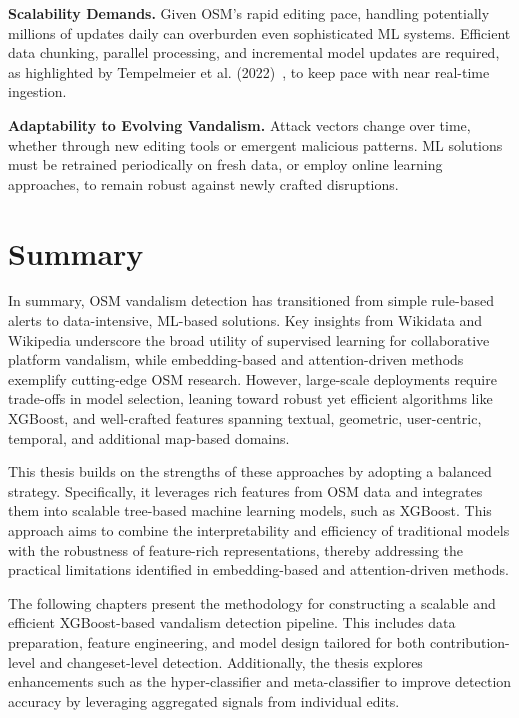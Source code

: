 \documentclass[
    13pt, %
    a4paper, %
    listof=totoc, %
    bibliography=totoc, %
    index=totoc, %
    headsepline
]{scrreprt}
\begin{document}
\noindent
\textbf{Scalability Demands.}
Given OSM’s rapid editing pace, handling potentially millions of updates daily can overburden even sophisticated ML systems. Efficient data chunking, parallel processing, and incremental model updates are required, as highlighted by Tempelmeier et al. (2022)~\cite{Tempelmeier2022}, to keep pace with near real-time ingestion.

\noindent
\textbf{Adaptability to Evolving Vandalism.}
Attack vectors change over time, whether through new editing tools or emergent malicious patterns. ML solutions must be retrained periodically on fresh data, or employ online learning approaches, to remain robust against newly crafted disruptions.


\section{Summary}

In summary, OSM vandalism detection has transitioned from simple rule-based alerts to data-intensive, ML-based solutions. Key insights from Wikidata and Wikipedia underscore the broad utility of supervised learning for collaborative platform vandalism, while embedding-based and attention-driven methods exemplify cutting-edge OSM research. However, large-scale deployments require trade-offs in model selection, leaning toward robust yet efficient algorithms like XGBoost, and well-crafted features spanning textual, geometric, user-centric, temporal, and additional map-based domains.

This thesis builds on the strengths of these approaches by adopting a balanced strategy. Specifically, it leverages rich features from OSM data and integrates them into scalable tree-based machine learning models, such as XGBoost. This approach aims to combine the interpretability and efficiency of traditional models with the robustness of feature-rich representations, thereby addressing the practical limitations identified in embedding-based and attention-driven methods.

The following chapters present the methodology for constructing a scalable and efficient XGBoost-based vandalism detection pipeline. This includes data preparation, feature engineering, and model design tailored for both contribution-level and changeset-level detection. Additionally, the thesis explores enhancements such as the hyper-classifier and meta-classifier to improve detection accuracy by leveraging aggregated signals from individual edits.
\end{document}
